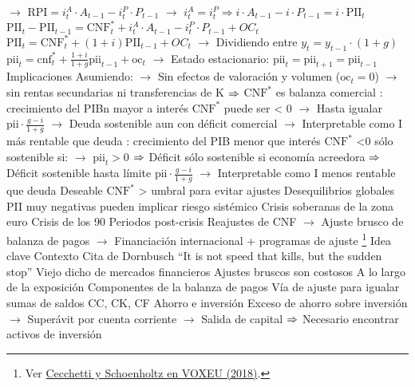 \documentclass{nuevotema}
\begin{document}
\begin{esquemal}
				\4[] $\to$ $\text{RPI} =i_t^A \cdot A_{t-1} - i_t^P\cdot P_{t-1}$
				\4[] $\to$ $i_t^A = i_t^P \Rightarrow i \cdot A_{t-1} - i\cdot P_{t-1} = i \cdot \text{PII}_t$
				\4[] $\text{PII}_t - \text{PII}_{t-1} = \text{CNF}^*_t + i_t^A \cdot A_{t-1} - i_t^P\cdot P_{t-1} + OC_t $
				\4[] $\text{PII}_t = \text{CNF}^*_t + (1+i) \text{PII}_{t-1} + OC_t$
				\4[] $\to$ Dividiendo entre $y_t = y_{t-1} \cdot (1+g)$
				\4[] $\text{pii}_t = \text{cnf}^*_t + \frac{1+i}{1+g}\text{pii}_{t-1} + \text{oc}_t$
				\4[] $\to$ Estado estacionario: $\text{pii}_t = \text{pii}_{t+1} = \text{pii}_{t-1}$
				\4[] 
				\4 Implicaciones
				\4[] Asumiendo:
				\4[] $\to$ Sin efectos de valoración y volumen ($\text{oc}_t=0$)
				\4[] $\to$ sin rentas secundarias ni transferencias de K
				\4[] $\then$ $\text{CNF}^*$ es balanza comercial
				\4[] : crecimiento del PIBn mayor a interés
				\4[] $\text{CNF}^*$ puede ser < 0
				\4[] $\to$ Hasta igualar $\text{pii} \cdot \frac{g-i}{1+g}$
				\4[] $\to$ Deuda sostenible aun con déficit comercial
				\4[] $\to$ Interpretable como I más rentable que deuda
				\4[] : crecimiento del PIB menor que interés
				\4[] $\text{CNF}^*$ <0 sólo sostenible si:
				\4[] $\to$ $\text{pii}_t > 0$
				\4[] $\then$ Déficit sólo sostenible si economía acreedora
				\4[] $\then$ Déficit sostenible hasta límite $\text{pii}\cdot \frac{g-i}{1+g}$
				\4[] $\to$ Interpretable como I menos rentable que deuda
				\4[$\then$] Deseable $\text{CNF}^*$ > umbral para evitar ajustes
			\3 Desequilibrios globales
				\4 PII muy negativas pueden implicar riesgo sistémico
				\4[] Crisis soberanas de la zona euro
				\4[] Crisis de los 90
				\4 Periodos post-crisis
				\4[] Reajustes de CNF
				\4[] $\to$ Ajuste brusco de balanza de pagos
				\4[] $\to$ Financiación internacional + programas de ajuste
	\1 \footnote{Ver \href{https://voxeu.org/content/sudden-stops-primer-balance-payments-crises}{Cecchetti y Schoenholtz en VOXEU (2018)}.}
		\2 Idea clave
			\3 Contexto
				\4 Cita de Dornbusch
				\4[] ``It is not speed that kills, but the sudden stop''
				\4[] Viejo dicho de mercados financieros
				\4 Ajustes bruscos son costosos
				\4 A lo largo de la exposición
				\4[] Componentes de la balanza de pagos
				\4[] Vía de ajuste para igualar sumas de saldos CC, CK, CF
				\4 Ahorro e inversión
				\4[] Exceso de ahorro sobre inversión
				\4[] $\to$ Superávit por cuenta corriente
				\4[] $\to$ Salida de capital
				\4[] $\then$ Necesario encontrar activos de inversión

\end{esquemal}
\end{document}
